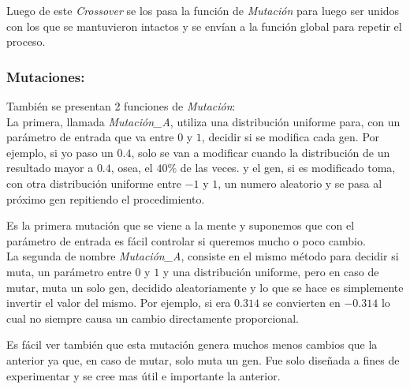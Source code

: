 Luego de este \emph{Crossover} se los pasa la función de \emph{Mutación} para luego ser unidos con los que se mantuvieron
intactos y se envían a la función global para repetir el proceso.


\subsubsection{Mutaciones:}

También se presentan 2 funciones de \emph{Mutación}:\\

La primera, llamada \emph{Mutación\_A}, utiliza una distribución uniforme para, con un parámetro de entrada que va entre $0$ y $1$,
decidir si se modifica cada gen. Por ejemplo, si yo paso un $0.4$, solo se van a modificar cuando
la distribución de un resultado mayor a $0.4$, osea, el $40\%$ de las veces. y el gen, si es modificado toma,
con otra distribución uniforme entre $-1$ y $1$, un numero aleatorio y se pasa al próximo gen repitiendo
el procedimiento.


Es la primera mutación que se viene a la mente y suponemos que con el parámetro de entrada es fácil controlar si queremos
mucho o poco cambio.\\

La segunda de nombre \emph{Mutación\_A}, consiste en el mismo método para decidir si muta, un parámetro  entre $0$ y $1$
y una distribución uniforme, pero en caso de mutar, muta un solo gen, decidido aleatoriamente y lo que se hace es simplemente
invertir el valor del mismo. Por ejemplo, si era $0.314$ se convierten en $-0.314$ lo cual no siempre causa un cambio
directamente proporcional.

Es fácil ver también que esta mutación genera muchos menos cambios que la anterior ya que, en caso de mutar, solo muta un gen.
Fue solo diseñada a fines de experimentar y se cree mas útil e importante la anterior.

